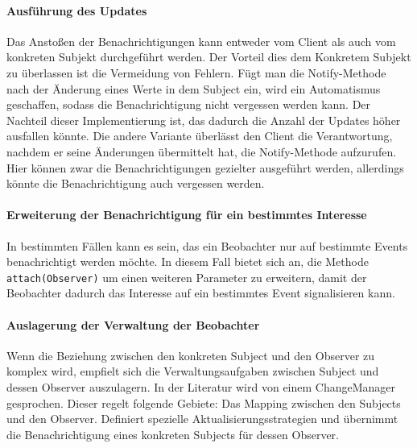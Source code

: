 \paragraph{Ausführung des Updates} Das Anstoßen der Benachrichtigungen kann entweder vom Client als auch vom konkreten Subjekt durchgeführt werden. Der Vorteil dies dem Konkretem Subjekt zu überlassen ist die Vermeidung von Fehlern. Fügt man die Notify-Methode nach der Änderung eines Werte in dem Subject ein, wird ein Automatismus geschaffen, sodass die Benachrichtigung nicht vergessen werden kann. Der Nachteil dieser Implementierung ist, das dadurch die Anzahl der Updates höher ausfallen könnte. Die andere Variante überlässt den Client die Verantwortung, nachdem er seine Änderungen übermittelt hat, die Notify-Methode aufzurufen. Hier können zwar die Benachrichtigungen gezielter ausgeführt werden, allerdings könnte die Benachrichtigung auch vergessen werden.



\paragraph{Erweiterung der Benachrichtigung für ein bestimmtes Interesse} In bestimmten Fällen kann es sein, das ein Beobachter nur auf bestimmte Events benachrichtigt werden möchte. In diesem Fall bietet sich an,  die Methode \texttt{attach(Observer)} um einen weiteren Parameter zu erweitern, damit der Beobachter dadurch das Interesse auf ein bestimmtes Event signalisieren kann.

\paragraph{Auslagerung der Verwaltung der Beobachter} Wenn die Beziehung zwischen den konkreten Subject und den Observer zu komplex wird, empfielt sich die Verwaltungsaufgaben zwischen Subject und dessen Observer auszulagern. In der Literatur wird von einem ChangeManager gesprochen. Dieser regelt folgende Gebiete: Das Mapping zwischen den Subjects und den Observer. Definiert spezielle Aktualisierungsstrategien und übernimmt die Benachrichtigung eines konkreten Subjects für dessen Observer.

